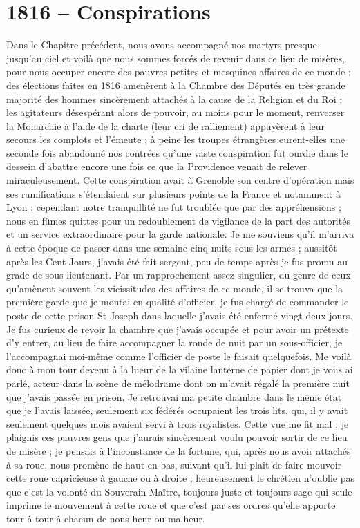\documentclass[11pt,a4paper]{report}
\begin{document}
\section*{1816 -- Conspirations}

Dans le Chapitre précédent, nous avons accompagné nos martyrs presque jusqu'au ciel et voilà que nous sommes forcés de revenir dans ce lieu de misères, pour nous occuper encore des pauvres petites et mesquines affaires de ce monde ; des élections faites en 1816 amenèrent à la Chambre des Députés en très grande majorité des hommes sincèrement attachés à la cause de la Religion et du Roi ; les agitateurs désespérant alors de pouvoir, au moins pour le moment, renverser la Monarchie à l'aide de la charte (leur cri de ralliement) appuyèrent à leur secours les complots et l'émeute ; à peine les troupes étrangères eurent-elles une seconde fois abandonné nos contrées qu'une vaste conspiration fut ourdie dans le dessein d'abattre encore une fois ce que la Providence venait de relever miraculeusement. Cette conspiration avait à Grenoble son centre d'opération mais ses ramifications s'étendaient sur plusieurs points de la France et notamment à Lyon ; cependant notre tranquillité ne fut troublée que par des appréhensions ; nous en fûmes quittes pour un redoublement de vigilance de la part des autorités et un service extraordinaire pour la garde nationale. Je me souviens qu'il m'arriva à cette époque de passer dans une semaine cinq nuits sous les armes ; aussitôt après les Cent-Jours, j'avais été fait sergent, peu de temps après je fus promu au grade de sous-lieutenant. Par un rapprochement assez singulier, du genre de ceux qu'amènent souvent les vicissitudes des affaires de ce monde, il se trouva que la première garde que je montai en qualité d'officier, je fus chargé de commander le poste de cette prison St Joseph dans laquelle j'avais été enfermé vingt-deux jours. Je fus curieux de revoir la chambre que j'avais occupée et pour avoir un prétexte d'y entrer, au lieu de faire accompagner la ronde de nuit par un sous-officier, je l'accompagnai moi-même comme l'officier de poste le faisait quelquefois. Me voilà donc à mon tour devenu à la lueur de la vilaine lanterne de papier dont je vous ai parlé, acteur dans la scène de mélodrame dont on m'avait régalé la première nuit que j'avais passée en prison. Je retrouvai ma petite chambre dans le même état que je l'avais laissée, seulement six fédérés occupaient les trois lits, qui, il y avait seulement quelques mois avaient servi à trois royalistes. Cette vue me fit mal ; je plaignis ces pauvres gens que j'aurais sincèrement voulu pouvoir sortir de ce lieu de misère ; je pensais à l'inconstance de la fortune, qui, après nous avoir attachés à sa roue, nous promène de haut en bas, suivant qu'il lui plaît de faire mouvoir cette roue capricieuse à gauche ou à droite ; heureusement le chrétien n'oublie pas que c'est la volonté du Souverain Maître, toujours juste et toujours sage qui seule imprime le mouvement à cette roue et que c'est par ses ordres qu'elle apporte tour à tour à chacun de nous heur ou malheur.
\end{document}

